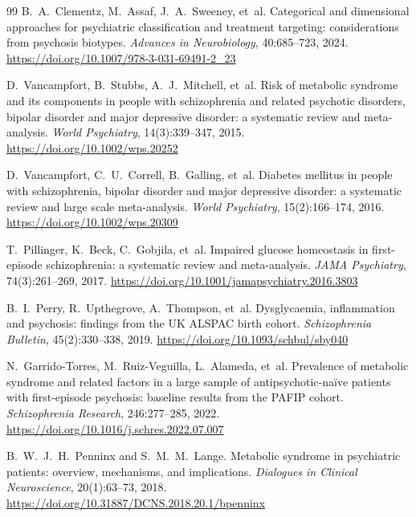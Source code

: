 \begin{thebibliography}{99}
 B.~A.~Clementz, M.~Assaf, J.~A.~Sweeney, et~al.
\newblock Categorical and dimensional approaches for psychiatric classification and treatment targeting:
considerations from psychosis biotypes. \emph{Advances in Neurobiology}, 40:685--723, 2024.
\newblock \url{https://doi.org/10.1007/978-3-031-69491-2_23}

 D.~Vancampfort, B.~Stubbs, A.~J.~Mitchell, et~al.
\newblock Risk of metabolic syndrome and its components in people with schizophrenia and related psychotic
disorders, bipolar disorder and major depressive disorder: a systematic review and meta-analysis.
\emph{World Psychiatry}, 14(3):339--347, 2015. \newblock \url{https://doi.org/10.1002/wps.20252}

 D.~Vancampfort, C.~U.~Correll, B.~Galling, et~al.
\newblock Diabetes mellitus in people with schizophrenia, bipolar disorder and major depressive disorder: a
systematic review and large scale meta-analysis. \emph{World Psychiatry}, 15(2):166--174, 2016.
\newblock \url{https://doi.org/10.1002/wps.20309}

 T.~Pillinger, K.~Beck, C.~Gobjila, et~al.
\newblock Impaired glucose homeostasis in first-episode schizophrenia: a systematic review and meta-analysis.
\emph{JAMA Psychiatry}, 74(3):261--269, 2017. \newblock \url{https://doi.org/10.1001/jamapsychiatry.2016.3803}

 B.~I.~Perry, R.~Upthegrove, A.~Thompson, et~al.
\newblock Dysglycaemia, inflammation and psychosis: findings from the UK ALSPAC birth cohort.
\emph{Schizophrenia Bulletin}, 45(2):330--338, 2019. \newblock \url{https://doi.org/10.1093/schbul/sby040}

 N.~Garrido-Torres, M.~Ruiz-Veguilla, L.~Alameda, et~al.
\newblock Prevalence of metabolic syndrome and related factors in a large sample of antipsychotic-na\"ive
patients with first-episode psychosis: baseline results from the PAFIP cohort. \emph{Schizophrenia Research},
246:277--285, 2022. \newblock \url{https://doi.org/10.1016/j.schres.2022.07.007}

 B.~W.~J.~H.~Penninx and S.~M.~M.~Lange.
\newblock Metabolic syndrome in psychiatric patients: overview, mechanisms, and implications.
\emph{Dialogues in Clinical Neuroscience}, 20(1):63--73, 2018.
\newblock \url{https://doi.org/10.31887/DCNS.2018.20.1/bpenninx}


\end{thebibliography}
